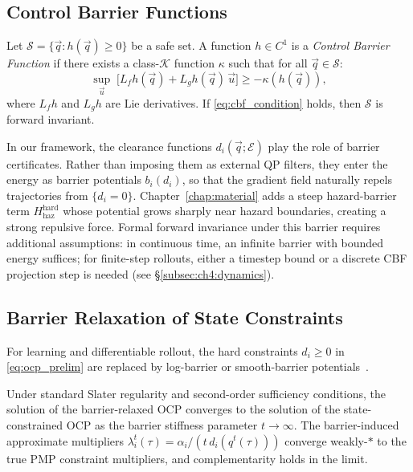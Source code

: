 \subsection{Control Barrier Functions}
\label{subsec:prelim:cbf}

\begin{definition}
\label{def:cbf}
Let $\mathcal{S} = \{\vec{q} : h(\vec{q}) \geq 0\}$ be a safe set.
A function $h \in C^1$ is a \emph{Control Barrier Function} if there exists
a class-$\mathcal{K}$ function $\kappa$ such that for all $\vec{q} \in \mathcal{S}$:
\begin{equation}
  \sup_{\vec{u}}\;\bigl[
    L_f h(\vec{q}) + L_g h(\vec{q})\,\vec{u}
  \bigr] \geq -\kappa(h(\vec{q})),
  \label{eq:cbf_condition}
\end{equation}
where $L_f h$ and $L_g h$ are Lie derivatives.
If \eqref{eq:cbf_condition} holds, then $\mathcal{S}$ is forward invariant.
\end{definition}

In our framework, the clearance functions $d_i(\vec{q};\mathcal{E})$
play the role of barrier certificates.
Rather than imposing them as external QP filters, they enter the energy as
barrier potentials $b_i(d_i)$, so that the gradient field naturally repels
trajectories from $\{d_i = 0\}$.
Chapter~\ref{chap:material} adds a steep hazard-barrier term
$H_{\mathrm{haz}}^{\mathrm{hard}}$ whose potential grows sharply near hazard
boundaries, creating a strong repulsive force.
Formal forward invariance under this barrier requires additional assumptions:
in continuous time, an infinite barrier with bounded energy suffices;
for finite-step rollouts, either a timestep bound or a discrete CBF
projection step is needed (see §\ref{subsec:ch4:dynamics}).

\subsection{Barrier Relaxation of State Constraints}
\label{subsec:prelim:barrier_relax}

For learning and differentiable rollout, the hard constraints
$d_i \geq 0$ in \eqref{eq:ocp_prelim} are replaced by
log-barrier or smooth-barrier potentials~\citep{NocedalWright2006NumericalOptimization}.

\begin{proposition}
\label{prop:barrier_convergence}
Under standard Slater regularity and second-order sufficiency conditions,
the solution of the barrier-relaxed OCP converges to the solution of the
state-constrained OCP as the barrier stiffness parameter $t \to \infty$.
The barrier-induced approximate multipliers
$\lambda_i^t(\tau) = \alpha_i/(t\,d_i(q^t(\tau)))$
converge weakly-$*$ to the true PMP constraint multipliers, and
complementarity holds in the limit.
\end{proposition}

